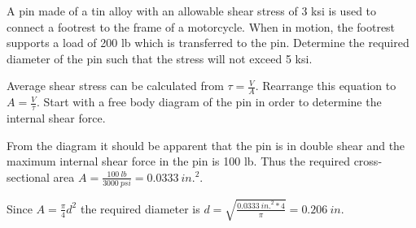 \documentclass[
  letterpaper,
  DIV=11,
  numbers=noendperiod]{scrreprt}
\begin{document}
\begin{tcolorbox}[enhanced jigsaw, breakable, opacityback=0, toptitle=1mm, left=2mm, colback=white, opacitybacktitle=0.6, colframe=quarto-callout-tip-color-frame, titlerule=0mm, arc=.35mm, leftrule=.75mm, bottomtitle=1mm, colbacktitle=quarto-callout-tip-color!10!white, rightrule=.15mm, title={Example 2.4}, bottomrule=.15mm, toprule=.15mm, coltitle=black]

A pin made of a tin alloy with an allowable shear stress of 3 ksi is
used to connect a footrest to the frame of a motorcycle. When in motion,
the footrest supports a load of 200 lb which is transferred to the pin.
Determine the required diameter of the pin such that the stress will not
exceed 5 ksi.

\begin{tcolorbox}[enhanced jigsaw, breakable, opacityback=0, toptitle=1mm, left=2mm, colback=white, opacitybacktitle=0.6, colframe=quarto-callout-tip-color-frame, titlerule=0mm, arc=.35mm, leftrule=.75mm, bottomtitle=1mm, colbacktitle=quarto-callout-tip-color!10!white, rightrule=.15mm, title={Solution}, bottomrule=.15mm, toprule=.15mm, coltitle=black]

Average shear stress can be calculated from \(\tau=\frac{V}{A}\).
Rearrange this equation to \(A=\frac{V}{\tau}\). Start with a free body
diagram of the pin in order to determine the internal shear force.

From the diagram it should be apparent that the pin is in double shear
and the maximum internal shear force in the pin is 100 lb. Thus the
required cross-sectional area
\(A=\frac{100{~lb}}{3000{~psi}}=0.0333{~in.}^2\).

Since \(A=\frac{\pi}{4} d^2\) the required diameter is
\(d=\sqrt{\frac{0.0333{~in.}^2 * 4}{\pi}}=0.206{~in}\).

\end{tcolorbox}

\end{tcolorbox}
\end{document}
